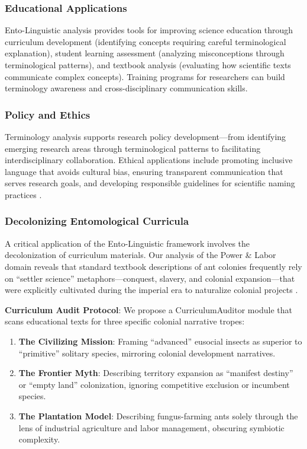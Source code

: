 \documentclass[
]{article}
\providecommand{\tightlist}{%
  \setlength{\itemsep}{0pt}\setlength{\parskip}{0pt}}
\numberwithin{equation}{section}
\renewcommand{\texttt}[1]{%
    \colorbox{codebg}{\color{codefg}\ttfamily #1}%
}
\begin{document}
\subsubsection{Educational Applications}\label{educational-applications}

Ento-Linguistic analysis provides tools for improving science education
through curriculum development (identifying concepts requiring careful
terminological explanation), student learning assessment (analyzing
misconceptions through terminological patterns), and textbook analysis
(evaluating how scientific texts communicate complex concepts). Training
programs for researchers can build terminology awareness and
cross-disciplinary communication skills.

\subsubsection{Policy and Ethics}\label{policy-and-ethics}

Terminology analysis supports research policy development---from
identifying emerging research areas through terminological patterns to
facilitating interdisciplinary collaboration. Ethical applications
include promoting inclusive language that avoids cultural bias, ensuring
transparent communication that serves research goals, and developing
responsible guidelines for scientific naming practices
\cite{betternamesproject2024}.

\subsubsection{Decolonizing Entomological
Curricula}\label{decolonizing-entomological-curricula}

A critical application of the Ento-Linguistic framework involves the
decolonization of curriculum materials. Our analysis of the Power \&
Labor domain reveals that standard textbook descriptions of ant colonies
frequently rely on ``settler science'' metaphors---conquest, slavery,
and colonial expansion---that were explicitly cultivated during the
imperial era to naturalize colonial projects
\cite{mavhunga2018transient}.

\textbf{Curriculum Audit Protocol}: We propose a
\texttt{CurriculumAuditor} module that scans educational texts for three
specific colonial narrative tropes:

\begin{enumerate}
\def\labelenumi{\arabic{enumi}.}
\tightlist
\item
  \textbf{The Civilizing Mission}: Framing ``advanced'' eusocial insects
  as superior to ``primitive'' solitary species, mirroring colonial
  development narratives.
\item
  \textbf{The Frontier Myth}: Describing territory expansion as
  ``manifest destiny'' or ``empty land'' colonization, ignoring
  competitive exclusion or incumbent species.
\item
  \textbf{The Plantation Model}: Describing fungus-farming ants solely
  through the lens of industrial agriculture and labor management,
  obscuring symbiotic complexity.
\end{enumerate}
\end{document}
